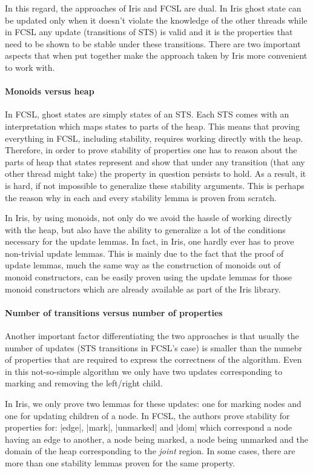 \documentclass[]{scrartcl}
\begin{document}
In this regard, the approaches of Iris and FCSL are dual.
In Iris ghost state can be updated only when it doesn't violate the knowledge
of the other threads while in FCSL any update (transitions of STS) is valid
and it is the properties that need to be shown to be stable under these transitions.
There are two important aspects that when put together make the approach taken by Iris
more convenient to work with.

\paragraph{Monoids versus heap}
In FCSL, ghost states are simply states of an STS.
Each STS comes with an interpretation which maps states to parts of the heap.
This means that proving everything in FCSL, including stability, requires working directly
with the heap.
Therefore, in order to prove stability of properties one has to reason about the
parts of heap that states represent and show that under any transition
(that any other thread might take) the property in question persists to hold.
As a result, it is hard, if not impossible to generalize these stability arguments.
This is perhaps the reason why in \cite{Sergey:2015:MVF:2737924.2737964} each and every stability lemma is proven from scratch.

In Iris, by using monoids, not only do we avoid the hassle of working directly with the heap,
but also have the ability to generalize a lot of the conditions necessary for the update lemmas.
In fact, in Iris, one hardly ever has to prove non-trivial update lemmas.
This is mainly due to the fact that the proof of update lemmas, much the same way
as the construction of monoids out of monoid constructors, can be easily proven using the
update lemmas for those monoid constructors which are already available as part of the Iris library.

\paragraph{Number of transitions versus number of properties}
Another important factor differentiating the two approaches is that  usually the number of
updates (STS transitions in FCSL's case) is smaller than the numebr of properties that
are required to express the correctness of the algorithm.
Even in this not-so-simple algorithm we only have two updates corresponding
to marking and removing the left/right child.

In Iris, we only prove two lemmas for these updates: one for marking nodes and one for
updating children of a node.
In FCSL, the authors prove stability for properties for: \Coqe|edge|,
\Coqe|mark|, \Coqe|unmarked| and \Coqe|dom| which correspond a node having an edge
to another, a node being marked, a node being unmarked and the domain of the heap
corresponding to the \textit{joint} region.
In some cases, there are more than one stability lemmas proven for the same property.
\end{document}
